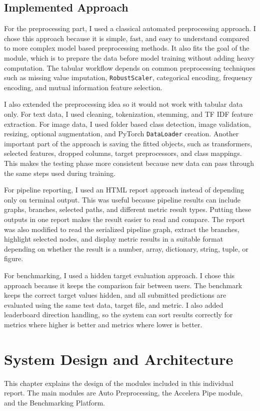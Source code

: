 \documentclass[12pt,a4paper,oneside]{report}
\begin{document}
\section{Implemented Approach}

\noindent For the preprocessing part, I used a classical automated
preprocessing approach. I chose this approach because it is simple, fast, and
easy to understand compared to more complex model based preprocessing methods.
It also fits the goal of the module, which is to prepare the data before model
training without adding heavy computation. The tabular workflow depends on
common preprocessing techniques such as missing value imputation,
\texttt{RobustScaler}, categorical encoding, frequency encoding, and mutual
information feature selection.

\noindent I also extended the preprocessing idea so it would not work with
tabular data only. For text data, I used cleaning, tokenization, stemming, and
TF IDF feature extraction. For image data, I used folder based class detection,
image validation, resizing, optional augmentation, and PyTorch
\texttt{DataLoader} creation. Another important part of the approach is saving
the fitted objects, such as transformers, selected features, dropped columns,
target preprocessors, and class mappings. This makes the testing phase more
consistent because new data can pass through the same steps used during
training.


\noindent For pipeline reporting, I used an HTML report approach instead of
depending only on terminal output. This was useful because pipeline results can
include graphs, branches, selected paths, and different metric result types.
Putting these outputs in one report makes the result easier to read and compare.
The report was also modified to read the serialized pipeline graph, extract the
branches, highlight selected nodes, and display metric results in a suitable
format depending on whether the result is a number, array, dictionary, string,
tuple, or figure.

\noindent For benchmarking, I used a hidden target evaluation approach. I chose
this approach because it keeps the comparison fair between users. The benchmark
keeps the correct target values hidden, and all submitted predictions are
evaluated using the same test data, target file, and metric. I also added
leaderboard direction handling, so the system can sort results correctly for
metrics where higher is better and metrics where lower is better.

\chapter{System Design and Architecture}
\label{chap:system design}
This chapter explains the design of the modules included in this individual report. The main modules are Auto Preprocessing, the Accelera Pipe module, and the Benchmarking Platform.
\end{document}
